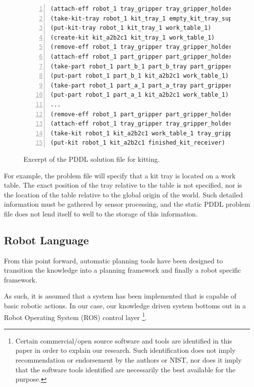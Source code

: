 \begin{figure}[t!h!]
\begin{minipage}{.5\paperwidth}
\begin{list}{}{\setlength{\leftmargin}{1em}}\item\small
\begin{Verbatim}[commandchars=\\\{\},fontsize=\scriptsize, numbers=left, numbersep=2pt]
(attach-eff robot_1 tray_gripper tray_gripper_holder)
(take-kit-tray robot_1 kit_tray_1 empty_kit_tray_supply tray_gripper work_table_1)
(put-kit-tray robot_1 kit_tray_1 work_table_1)
(create-kit kit_a2b2c1 kit_tray_1 work_table_1)
(remove-eff robot_1 tray_gripper tray_gripper_holder)
(attach-eff robot_1 part_gripper part_gripper_holder)
(take-part robot_1 part_b_1 part_b_tray part_gripper work_table_1 kit_a2b2c1)
(put-part robot_1 part_b_1 kit_a2b2c1 work_table_1)
(take-part robot_1 part_a_1 part_a_tray part_gripper work_table_1 kit_a2b2c1)
(put-part robot_1 part_a_1 kit_a2b2c1 work_table_1)
...
(remove-eff robot_1 part_gripper part_gripper_holder)
(attach-eff robot_1 tray_gripper tray_gripper_holder)
(take-kit robot_1 kit_a2b2c1 work_table_1 tray_gripper)
(put-kit robot_1 kit_a2b2c1 finished_kit_receiver)
\end{Verbatim}
\end{list}
\end{minipage}
\caption{Excerpt of the PDDL solution file for kitting.}
\label{fig:domain}
\end{figure}
For example, the problem file will specify that a kit tray is located
on a work table. The exact position of the tray relative to the table
is not specified, nor is the location of the table relative to the global
origin of the world. Such detailed information must be gathered by sensor
processing, and the static PDDL problem file does not lend itself to well
to the storage of this information.

\subsection{Robot Language}
From this point forward, automatic planning tools have been designed to transition
the knowledge into a planning framework and finally a robot specific framework.

As such, it is assumed that a system has been implemented
that is capable of basic robotic actions. In our case, our knowledge
driven system bottoms out in a Robot Operating System (ROS) control layer
\footnote{Certain commercial/open source software and tools are identified
in this paper in order to explain our research. Such identification does not imply
recommendation or endorsement by the authors or NIST, nor does it
imply that the software tools identified are necessarily the best available for the purpose.}. 